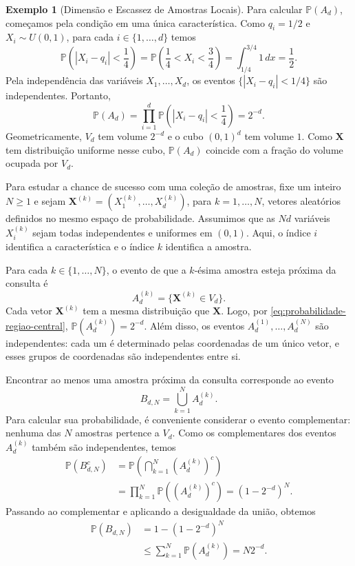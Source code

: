 \documentclass[12pt,portuguese]{article}
\theoremstyle{definition}
\newtheorem{example}[example]{Exemplo}
\theoremstyle{plainexercise}
\theoremstyle{starredexercise}
\theoremstyle{definition}
\begin{document}
\begin{example}[Dimensão e Escassez de Amostras Locais]
  Para calcular $\mathbb{P}(A_d)$, começamos pela condição em uma única
  característica. Como $q_i=1/2$ e $X_i\sim U(0,1)$, para cada
  $i\in\{1,\ldots,d\}$ temos
  \[
    \mathbb{P}\left(|X_i-q_i|<\frac14\right)
    =\mathbb{P}\left(\frac14<X_i<\frac34\right)
    =\int_{1/4}^{3/4}1\,dx=\frac12.
  \]
  Pela independência das variáveis $X_1,\ldots,X_d$, os eventos
  $\{|X_i-q_i|<1/4\}$ são independentes. Portanto,
  \begin{equation}\label{eq:probabilidade-regiao-central}
    \mathbb{P}(A_d)
    =\prod_{i=1}^{d}\mathbb{P}\left(|X_i-q_i|<\frac14\right)
    =2^{-d}.
  \end{equation}
  Geometricamente, $V_d$ tem volume $2^{-d}$ e o cubo $(0,1)^d$ tem volume
  $1$. Como $\mathbf{X}$ tem distribuição uniforme nesse cubo,
  $\mathbb{P}(A_d)$ coincide com a fração do volume ocupada por $V_d$.

  Para estudar a chance de sucesso com uma coleção de amostras, fixe um
  inteiro $N\geqslant1$ e sejam
  $\mathbf{X}^{(k)}=(X_1^{(k)},\ldots,X_d^{(k)})$, para $k=1,\ldots,N$,
  vetores aleatórios definidos no mesmo espaço de probabilidade.
  Assumimos que as $Nd$ variáveis $X_i^{(k)}$ sejam todas independentes e
  uniformes em $(0,1)$. Aqui, o índice $i$ identifica a característica e o
  índice $k$ identifica a amostra.

  Para cada $k\in\{1,\ldots,N\}$, o evento de que a $k$-ésima amostra
  esteja próxima da consulta é
  \[
    A_d^{(k)}=\{\mathbf{X}^{(k)}\in V_d\}.
  \]
  Cada vetor $\mathbf{X}^{(k)}$ tem a mesma distribuição que $\mathbf{X}$.
  Logo, por \eqref{eq:probabilidade-regiao-central},
  $\mathbb{P}(A_d^{(k)})=2^{-d}$. Além disso, os eventos
  $A_d^{(1)},\ldots,A_d^{(N)}$ são independentes: cada um é determinado
  pelas coordenadas de um único vetor, e esses grupos de coordenadas são
  independentes entre si.

  Encontrar ao menos uma amostra próxima da consulta corresponde ao evento
  \[
    B_{d,N}=\bigcup_{k=1}^{N}A_d^{(k)}.
  \]
  Para calcular sua probabilidade, é conveniente considerar o evento
  complementar: nenhuma das $N$ amostras pertence a $V_d$. Como os
  complementares dos eventos $A_d^{(k)}$ também são independentes, temos
  \begin{align*}
    \mathbb{P}(B_{d,N}^{c})
    &=\mathbb{P}\left(\bigcap_{k=1}^{N}(A_d^{(k)})^c\right)
    \\[0.2cm]
    &=\prod_{k=1}^{N}\mathbb{P}((A_d^{(k)})^c)
    =(1-2^{-d})^N.
  \end{align*}
  Passando ao complementar e aplicando a desigualdade da união, obtemos
  \begin{equation}\label{eq:probabilidade-alguma-amostra-central}
    \begin{aligned}
      \mathbb{P}(B_{d,N})&=1-(1-2^{-d})^N
      \\[0.2cm]
      &\leqslant\sum_{k=1}^{N}\mathbb{P}(A_d^{(k)})=N2^{-d}.
    \end{aligned}
  \end{equation}


\end{example}
\end{document}
